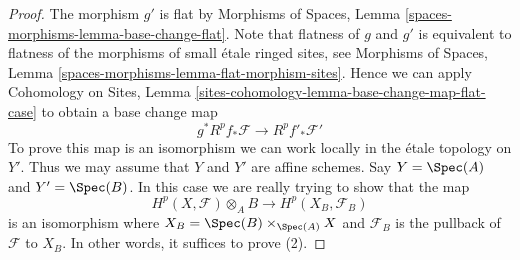 \begin{proof}
The morphism $g'$ is flat by
Morphisms of Spaces, Lemma \ref{spaces-morphisms-lemma-base-change-flat}.
Note that flatness of $g$ and $g'$ is equivalent to flatness
of the morphisms of small \'etale ringed sites, see
Morphisms of Spaces, Lemma \ref{spaces-morphisms-lemma-flat-morphism-sites}.
Hence we can apply
Cohomology on Sites, Lemma
\ref{sites-cohomology-lemma-base-change-map-flat-case}
to obtain a base change map
$$
g^*R^pf_*\mathcal{F} \longrightarrow R^pf'_*\mathcal{F}'
$$
To prove this map is an isomorphism we can work locally in the \'etale
topology on $Y'$. Thus we may assume that $Y$ and $Y'$ are affine
schemes. Say $Y = \Spec(A)$ and $Y' = \Spec(B)$.
In this case we are really trying to show that the map
$$
H^p(X, \mathcal{F}) \otimes_A B \longrightarrow H^p(X_B, \mathcal{F}_B)
$$
is an isomorphism where $X_B = \Spec(B) \times_{\Spec(A)} X$ and
$\mathcal{F}_B$ is the pullback of $\mathcal{F}$ to $X_B$.
In other words, it suffices to prove (2).


\end{proof}
